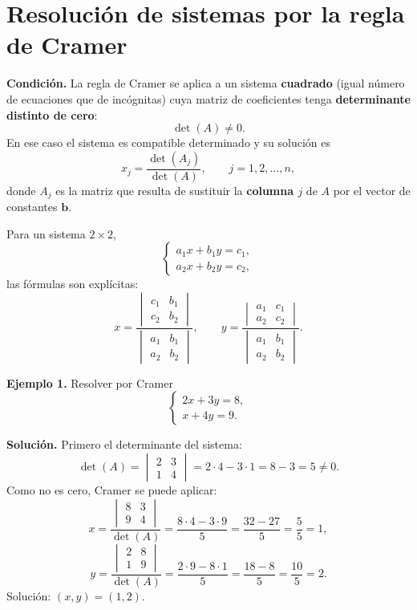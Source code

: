 \documentclass[12pt, letterpaper]{article}
\newcommand{\mwdet}[1]{\ensuremath{\begin{vmatrix}#1\end{vmatrix}}}
\begin{document}
\section{Resolución de sistemas por la regla de Cramer}

\begin{cuadroteoria}
  \small
  \textbf{Condición.} La regla de Cramer se aplica a un sistema
  \textbf{cuadrado} (igual número de ecuaciones que de incógnitas) cuya
  matriz de coeficientes tenga \textbf{determinante distinto de cero}:
  \[
    \det(A)\neq0.
  \]
  En ese caso el sistema es compatible determinado y su solución es
  \[
    x_j=\frac{\det(A_j)}{\det(A)},\qquad j=1,2,\dots,n,
  \]
  donde $A_j$ es la matriz que resulta de sustituir la \textbf{columna $j$}
  de $A$ por el vector de constantes $\mathbf{b}$.
\end{cuadroteoria}

Para un sistema $2\times2$,
\[
  \begin{cases}
    a_1x+b_1y=c_1,\\
    a_2x+b_2y=c_2,
  \end{cases}
\]
las fórmulas son explícitas:
\[
  x=\frac{\mwdet{c_1&b_1\\c_2&b_2}}{\mwdet{a_1&b_1\\a_2&b_2}},
  \qquad
  y=\frac{\mwdet{a_1&c_1\\a_2&c_2}}{\mwdet{a_1&b_1\\a_2&b_2}}.
\]

\begin{cuadrosolucion}
  \small
  \textbf{Ejemplo 1.} Resolver por Cramer
  \[
    \begin{cases}
      2x+3y=8,\\
      x+4y=9.
    \end{cases}
  \]

  \medskip
  \textbf{Solución.} Primero el determinante del sistema:
  \[
    \det(A)=\mwdet{2&3\\1&4}=2\cdot4-3\cdot1=8-3=5\neq0.
  \]
  Como no es cero, Cramer se puede aplicar:
  \[
    x=\frac{\mwdet{8&3\\9&4}}{\det(A)}
     =\frac{8\cdot4-3\cdot9}{5}
     =\frac{32-27}{5}=\frac{5}{5}=1,
  \]
  \[
    y=\frac{\mwdet{2&8\\1&9}}{\det(A)}
     =\frac{2\cdot9-8\cdot1}{5}
     =\frac{18-8}{5}=\frac{10}{5}=2.
  \]
  Solución: $(x,y)=(1,2)$.
\end{cuadrosolucion}
\end{document}
